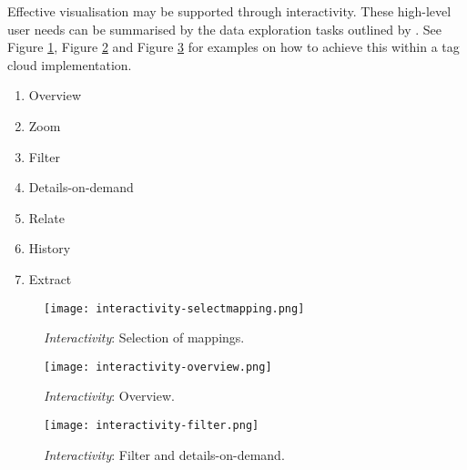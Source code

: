 
Effective visualisation may be supported through interactivity. These high-level user needs can be summarised by the data exploration tasks outlined by \citet{schneiderman96}. See Figure \ref{fig:selectmapping}, Figure \ref{fig:overview}  and Figure \ref{fig:filter} for examples on how to achieve this within a tag cloud implementation.

\begin{enumerate}
	\item Overview
	\item Zoom
	\item Filter
	\item Details-on-demand
	\item Relate
	\item History
	\item Extract
\end{enumerate}

\begin{figure}[h!]
	\centering
	\texttt{[image: interactivity-selectmapping.png]}
	\caption{\emph{Interactivity}: Selection of mappings.}
	\label{fig:selectmapping}
\end{figure}

\begin{figure}[h!]
	\centering
	\texttt{[image: interactivity-overview.png]}
	\caption{\emph{Interactivity}: Overview.}
	\label{fig:overview}
\end{figure}

\begin{figure}[h!]
   \centering
   \texttt{[image: interactivity-filter.png]}
  \caption{\emph{Interactivity}: Filter and details-on-demand.}

	\label{fig:filter}
\end{figure}


